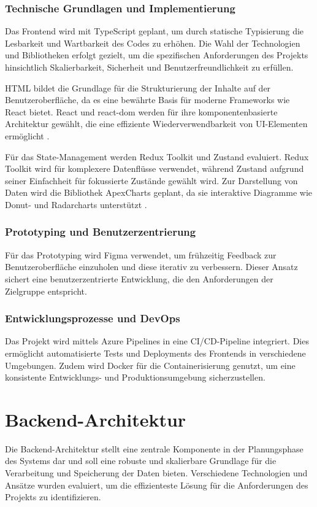 \subsubsection*{Technische Grundlagen und Implementierung}
Das Frontend wird mit TypeScript geplant, um durch statische Typisierung die Lesbarkeit und Wartbarkeit des Codes zu erhöhen. Die Wahl der Technologien und Bibliotheken erfolgt gezielt, um die spezifischen Anforderungen des Projekts hinsichtlich Skalierbarkeit, Sicherheit und Benutzerfreundlichkeit zu erfüllen.

HTML bildet die Grundlage für die Strukturierung der Inhalte auf der Benutzeroberfläche, da es eine bewährte Basis für moderne Frameworks wie React bietet. React und react-dom werden für ihre komponentenbasierte Architektur gewählt, die eine effiziente Wiederverwendbarkeit von UI-Elementen ermöglicht \cite{facebook2021react}. 

Für das State-Management werden Redux Toolkit und Zustand evaluiert. Redux Toolkit wird für komplexere Datenflüsse verwendet, während Zustand aufgrund seiner Einfachheit für fokussierte Zustände gewählt wird. Zur Darstellung von Daten wird die Bibliothek ApexCharts geplant, da sie interaktive Diagramme wie Donut- und Radarcharts unterstützt \cite{apexchartsDoc}. 

\subsubsection*{Prototyping und Benutzerzentrierung} 
Für das Prototyping wird Figma verwendet, um frühzeitig Feedback zur Benutzeroberfläche einzuholen und diese iterativ zu verbessern. Dieser Ansatz sichert eine benutzerzentrierte Entwicklung, die den Anforderungen der Zielgruppe entspricht.

\subsubsection*{Entwicklungsprozesse und DevOps} 
Das Projekt wird mittels Azure Pipelines in eine CI/CD-Pipeline integriert. Dies ermöglicht automatisierte Tests und Deployments des Frontends in verschiedene Umgebungen. Zudem wird Docker für die Containerisierung genutzt, um eine konsistente Entwicklungs- und Produktionsumgebung sicherzustellen.

\section{Backend-Architektur}
Die Backend-Architektur stellt eine zentrale Komponente in der Planungsphase des Systems dar und soll eine robuste und skalierbare Grundlage für die Verarbeitung und Speicherung der Daten bieten. Verschiedene Technologien und Ansätze wurden evaluiert, um die effizienteste Lösung für die Anforderungen des Projekts zu identifizieren.

